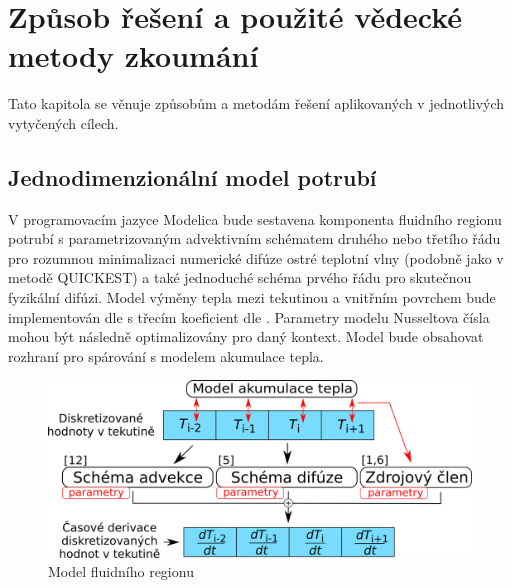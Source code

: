 \chapter{Způsob řešení a použité vědecké metody zkoumání}
Tato kapitola se věnuje způsobům a metodám řešení aplikovaných v jednotlivých
vytyčených cílech.
\section{Jednodimenzionální model potrubí}
\label{sec:1Dpipe}
V programovacím jazyce Modelica bude sestavena komponenta fluidního regionu
potrubí s parametrizovaným advektivním schématem druhého nebo třetího řádu pro
rozumnou minimalizaci numerické difúze ostré teplotní vlny (podobně jako v
metodě QUICKEST) a také jednoduché schéma prvého řádu pro skutečnou fyzikální
difúzi. Model výměny tepla mezi tekutinou a vnitřním povrchem bude
implementován dle \cite{Abraham2009} s třecím koeficient dle
\cite{Churchill1977}. Parametry modelu Nusseltova čísla mohou být následně
optimalizovány pro daný kontext. Model bude obsahovat rozhraní pro spárování s
modelem akumulace tepla.
\begin{figure}[h]
\begin{center}
  \includegraphics[scale=0.9]{figures/1D_model_pipe}
\end{center}
\caption{Model fluidního regionu}
\label{fig:pipe_model}
\end{figure}

